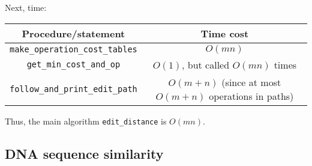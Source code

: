 \documentclass[paper=a4, fontsize=11pt]{scrartcl} %
\numberwithin{equation}{section} %
\numberwithin{figure}{section} %
\numberwithin{table}{section} %
\begin{document}
Next, time:

\begin{center}
\begin{tabular}{ | c | c | }
\hline
\textbf{Procedure/statement} & \textbf{Time cost} \\
\hline
\texttt{make\_operation\_cost\_tables} & $O(mn)$ \\
\hline
\texttt{get\_min\_cost\_and\_op} & $O(1)$, but called $O(mn)$ times \\
\hline
\texttt{follow\_and\_print\_edit\_path} & $O(m + n)$ (since at most $O(m + n)$ operations in paths) \\
\hline
\end{tabular}
\end{center}

Thus, the main algorithm \texttt{edit\_distance} is $O(mn)$.

\subsection{DNA sequence similarity}
\end{document}
